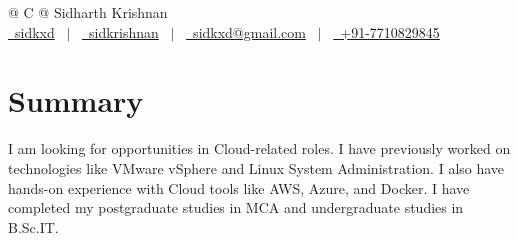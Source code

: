 \documentclass[a4paper,12pt]{article}
\begin{document}
\pagestyle{empty} 



\begin{tabularx}{\linewidth}{@{} C @{}}
\Huge{Sidharth Krishnan} \\[7.5pt]
\href{https://github.com/sidkxd}{\raisebox{-0.05\height}\faGithub\ sidkxd} \ $|$ \ 
\href{https://linkedin.com/in/sidkrishnan}{\raisebox{-0.05\height}\faLinkedin\ sidkrishnan} \ $|$ \ 
\href{mailto:sidkxd@gmail.com}{\raisebox{-0.05\height}\faEnvelope \ sidkxd@gmail.com} \ $|$ \ 
\href{tel:+917710829845}{\raisebox{-0.05\height}\faMobile \ +91-7710829845} \\
\end{tabularx}

\section{Summary}
\noindent I am looking for opportunities in Cloud-related roles. I have previously worked on technologies like VMware vSphere and Linux System Administration. I also have hands-on experience with Cloud tools like AWS, Azure, and Docker. I have completed my postgraduate studies in MCA and undergraduate studies in B.Sc.IT.
\end{document}
